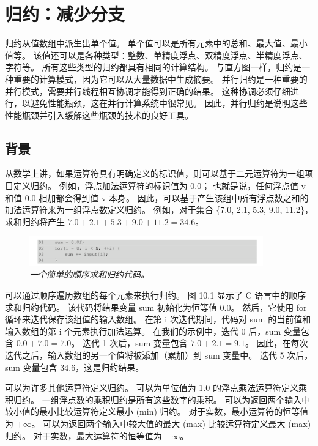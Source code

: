 \section{归约：减少分支}
归约从值数组中派生出单个值。 单个值可以是所有元素中的总和、最大值、最小值等。 
该值还可以是各种类型：整数、单精度浮点、双精度浮点、半精度浮点、字符等。 所有这些类型的归约都具有相同的计算结构。 
与直方图一样，归约是一种重要的计算模式，因为它可以从大量数据中生成摘要。 
并行归约是一种重要的并行模式，需要并行线程相互协调才能得到正确的结果。 
这种协调必须仔细进行，以避免性能瓶颈，这在并行计算系统中很常见。 
因此，并行归约是说明这些性能瓶颈并引入缓解这些瓶颈的技术的良好工具。

\subsection{背景}
从数学上讲，如果运算符具有明确定义的标识值，则可以基于二元运算符为一组项目定义归约。 
例如，浮点加法运算符的标识值为 0.0； 也就是说，任何浮点值 v 和值 0.0 相加都会得到值 v 本身。 
因此，可以基于产生该组中所有浮点数之和的加法运算符来为一组浮点数定义归约。 
例如，对于集合 \{7.0, 2.1, 5.3, 9.0, 11.2\}，求和归约将产生 $7.0+2.1 +5.3+9.0+11.2 = 34.6$。

\begin{figure}[H]
	\centering
	\includegraphics[width=0.9\textwidth]{figs/F10.1.png}
	\caption{\textit{一个简单的顺序求和归约代码。}}
\end{figure}

可以通过顺序遍历数组的每个元素来执行归约。 图 10.1 显示了 C 语言中的顺序求和归约代码。
该代码将结果变量 sum 初始化为恒等值 0.0。 然后，它使用 for 循环来迭代保存该组值的输入数组。 
在第 i 次迭代期间，代码对 sum 的当前值和输入数组的第 i 个元素执行加法运算。 
在我们的示例中，迭代 0 后，sum 变量包含 $0.0+7.0 = 7.0$。 迭代 1 次后，sum 变量包含 $7.0+2.1 = 9.1$。 
因此，在每次迭代之后，输入数组的另一个值将被添加（累加）到 sum 变量中。 迭代 5 次后，sum 变量包含 34.6，这是归约结果。

可以为许多其他运算符定义归约。 可以为单位值为 1.0 的浮点乘法运算符定义乘积归约。 
一组浮点数的乘积归约是所有这些数字的乘积。 可以为返回两个输入中较小值的最小比较运算符定义最小 (min) 归约。 
对于实数，最小运算符的恒等值为 $+\infty$。 可以为返回两个输入中较大值的最大 (max) 比较运算符定义最大 (max) 归约。 
对于实数，最大运算符的恒等值为 $-\infty$。

